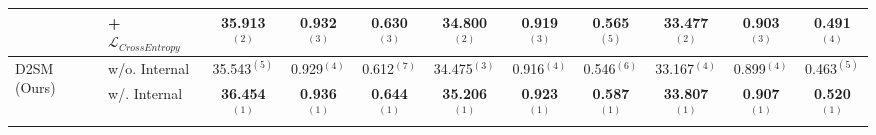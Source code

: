 \begin{table}[htbp]
{\begin{tabular}{llccccccccc}
			                                                                         & + $\mathcal{L}_{CrossEntropy}$   & 35.913$^{(2)}$          & 0.932$^{(3)}$          & 0.630$^{(3)}$          & 34.800$^{(2)}$          & 0.919$^{(3)}$          & 0.565$^{(5)}$          & 33.477$^{(2)}$          & 0.903$^{(3)}$          & 0.491$^{(4)}$          \\
			\hline\multirow{2}{*}{D2SM (Ours)}                                       & w/o. Internal                                               & 35.543$^{(5)}$          & 0.929$^{(4)}$          & 0.612$^{(7)}$          & 34.475$^{(3)}$          & 0.916$^{(4)}$          & 0.546$^{(6)}$          & 33.167$^{(4)}$          & 0.899$^{(4)}$          & 0.463$^{(5)}$          \\
			                                                                         & w/. Internal                                                & \textbf{36.454$^{(1)}$} & \textbf{0.936$^{(1)}$} & \textbf{0.644$^{(1)}$} & \textbf{35.206$^{(1)}$} & \textbf{0.923$^{(1)}$} & \textbf{0.587$^{(1)}$} & \textbf{33.807$^{(1)}$} & \textbf{0.907$^{(1)}$} & \textbf{0.520$^{(1)}$} \\
			  

\end{tabular}}
\end{table}
